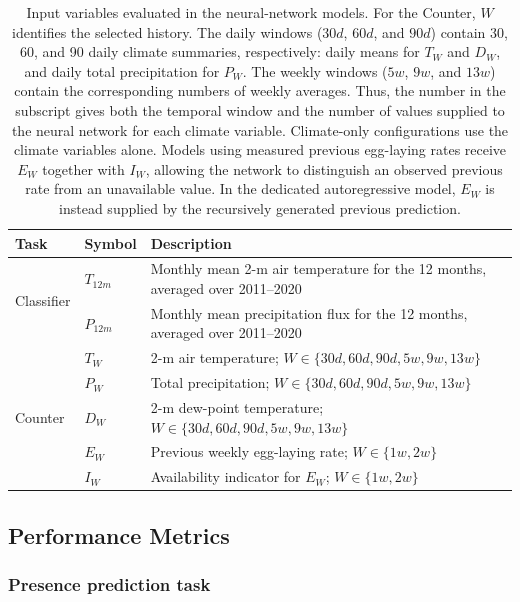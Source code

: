 \documentclass[preprint,12pt]{elsarticle}
\begin{document}
\begin{table}[ht]
\centering
{\renewcommand{\arraystretch}{1.15}
\begin{tabular}{|l|l|p{11.5cm}|}
\hline
\textbf{Task} & \textbf{Symbol} & \textbf{Description} \\
\hline
\multirow{2}{*}{Classifier} 
  & $T_{12m}$ & Monthly mean 2-m air temperature for the 12 months, averaged over 2011--2020 \\
  \cline{2-3}
  & $P_{12m}$ & Monthly mean precipitation flux for the 12 months, averaged over 2011--2020 \\
\hline
\multirow{5}{*}{Counter}
  & $T_W$ & 2-m air temperature; $W \in \{30d,60d,90d,5w,9w,13w\}$ \\
  \cline{2-3}
  & $P_W$ & Total precipitation; $W \in \{30d,60d,90d,5w,9w,13w\}$ \\
  \cline{2-3}
  & $D_W$ & 2-m dew-point temperature; $W \in \{30d,60d,90d,5w,9w,13w\}$ \\
  \cline{2-3}
  & $E_W$ & Previous weekly egg-laying rate; $W \in \{1w,2w\}$ \\
  \cline{2-3}
  & $I_W$ & Availability indicator for $E_W$; $W \in \{1w,2w\}$ \\
\hline
\end{tabular}
}
\caption{Input variables evaluated in the neural-network models. For the Counter, $W$ identifies the selected history. The daily windows ($30d$, $60d$, and $90d$) contain 30, 60, and 90 daily climate summaries, respectively: daily means for $T_W$ and $D_W$, and daily total precipitation for $P_W$. The weekly windows ($5w$, $9w$, and $13w$) contain the corresponding numbers of weekly averages. Thus, the number in the subscript gives both the temporal window and the number of values supplied to the neural network for each climate variable. Climate-only configurations use the climate variables alone. Models using measured previous egg-laying rates receive $E_W$ together with $I_W$, allowing the network to distinguish an observed previous rate from an unavailable value. In the dedicated autoregressive model, $E_W$ is instead supplied by the recursively generated previous prediction.}
\label{tab:inputs_var}
\end{table}

\subsection{Performance Metrics}

\subsubsection{Presence prediction task}
\end{document}
